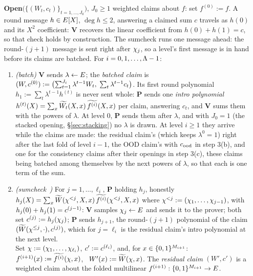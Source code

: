 \begin{protocol}
\smallskip
\textbf{Open}$\bigl(\{(W_t, c_t)\}_{t = 1, \dots, J_0}\bigr)$, $J_0 \ge 1$ weighted claims about $f$: set $f^{(0)} := f$. A round message $h \in E[X]$, $\deg h \le 2$, answering a claimed sum $c$ travels as $h(0)$ and its $X^2$ coefficient: $\mathbf{V}$ recovers the linear coefficient from $h(0) + h(1) = c$, so that check holds by construction. The sumcheck runs one message ahead: the round-$(j{+}1)$ message is sent right after $\chi_j$, so a level's first message is in hand before its claims are batched. For $i = 0, 1, \dots, \Lambda - 1$:
\begin{enumerate}[itemsep=0.5pt,topsep=2pt]
\item \emph{(batch)} $\mathbf{V}$ sends $\lambda \leftarrow E$; the \emph{batched claim} is $(W, c^{(0)}) := \bigl(\sum_{t = 1}^{J_i} \lambda^{t-1} W_t,\; \sum_{t} \lambda^{t-1} c_t\bigr)$. Its first round polynomial $h_1 := \sum_t \lambda^{t-1} h^{(t)}$ is never sent whole: $\mathbf{P}$ sends one \emph{intro polynomial} $h^{(t)}(X) = \sum_{x} \widetilde{W_t}(X, x)\, \widetilde{f^{(i)}}(X, x)$ per claim, answering $c_t$, and $\mathbf{V}$ sums them with the powers of $\lambda$. At level $0$, $\mathbf{P}$ sends them after $\lambda$, and with $J_0 = 1$ (the stacked opening, \S\ref{sec:stacking}) no $\lambda$ is drawn. At level $i \ge 1$ they arrive while the claims are made: the residual claim's (which keeps $\lambda^0 = 1$) right after the last fold of level $i-1$, the OOD claim's with $c_{\mathrm{ood}}$ in step 3(b), and one for the consistency claims after their openings in step 3(c), these claims being batched among themselves by the next powers of $\lambda$, so that each is one term of the sum.
\item \emph{(sumcheck~\cite{LFKN92})} For $j = 1, \dots, \ell_i$, $\mathbf{P}$ holding $h_j$, honestly $h_j(X) = \sum_{x} \widetilde{W}(\chi^{<j}, X, x)\, \widetilde{f^{(i)}}(\chi^{<j}, X, x)$ where $\chi^{<j} := (\chi_1, \dots, \chi_{j-1})$, with $h_j(0) + h_j(1) = c^{(j-1)}$: $\mathbf{V}$ samples $\chi_j \leftarrow E$ and sends it to the prover; both set $c^{(j)} := h_j(\chi_j)$; $\mathbf{P}$ sends $h_{j+1}$, the round-$(j{+}1)$ polynomial of the claim $(\widetilde{W}(\chi^{\le j}, \cdot), c^{(j)})$, which for $j = \ell_i$ is the residual claim's intro polynomial at the next level.\\
Set $\chi := (\chi_1, \dots, \chi_{\ell_i})$, $c' := c^{(\ell_i)}$, and, for $x \in \{0,1\}^{M_{i+1}}$: \ $f^{(i+1)}(x) := \widetilde{f^{(i)}}(\chi, x)$, \ $W'(x) := \widetilde{W}(\chi, x)$. The \emph{residual claim} $(W', c')$ is a weighted claim about the folded multilinear $f^{(i+1)} : \{0,1\}^{M_{i+1}} \to E$.

\end{enumerate}
\end{protocol}
